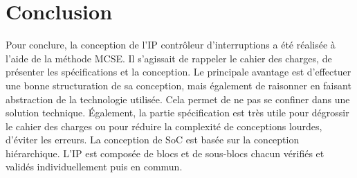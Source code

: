 \section{Conclusion}


Pour conclure, la conception de l'IP contrôleur d'interruptions a été réalisée à l'aide de la méthode MCSE.
Il s'agissait de rappeler le cahier des charges, de présenter les spécifications et la conception.
Le principale avantage est d’effectuer une bonne structuration de sa conception, mais également de raisonner en faisant abstraction de la technologie utilisée. 
Cela permet de ne pas se confiner dans une solution technique. 
Également, la partie spécification est très utile pour dégrossir le cahier des charges ou pour réduire la complexité de conceptions lourdes, d’éviter les erreurs.
La conception de SoC est basée sur la conception hiérarchique.
L'IP est composée de blocs et de sous-blocs chacun vérifiés et validés individuellement puis en commun.
